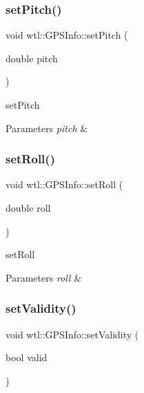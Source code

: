 \subsubsection{\texorpdfstring{set\+Pitch()}{setPitch()}}
{\footnotesize\ttfamily void wtl\+::\+G\+P\+S\+Info\+::set\+Pitch (\begin{DoxyParamCaption}\item[{double}]{pitch }\end{DoxyParamCaption})}



set\+Pitch 


\begin{DoxyParams}{Parameters}
{\em pitch} & \\
\hline
\end{DoxyParams}
\mbox{\label{classwtl_1_1_g_p_s_info_a2930689283ef6f7e4aba0da7d5795c9f}} 
\subsubsection{\texorpdfstring{set\+Roll()}{setRoll()}}
{\footnotesize\ttfamily void wtl\+::\+G\+P\+S\+Info\+::set\+Roll (\begin{DoxyParamCaption}\item[{double}]{roll }\end{DoxyParamCaption})}



set\+Roll 


\begin{DoxyParams}{Parameters}
{\em roll} & \\
\hline
\end{DoxyParams}
\mbox{\label{classwtl_1_1_g_p_s_info_a161bc31bddc2b42889e526d9a729d7d7}} 
\subsubsection{\texorpdfstring{set\+Validity()}{setValidity()}}
{\footnotesize\ttfamily void wtl\+::\+G\+P\+S\+Info\+::set\+Validity (\begin{DoxyParamCaption}\item[{bool}]{valid }\end{DoxyParamCaption})}

